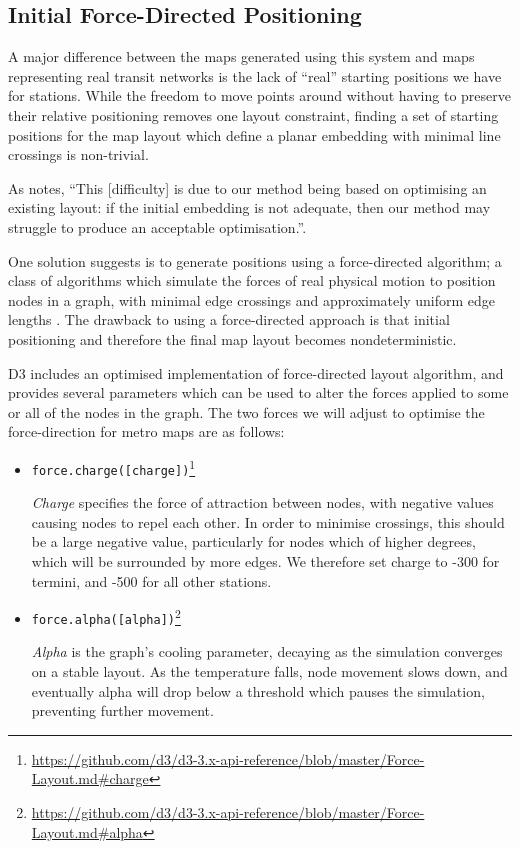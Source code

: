 \subsection{Initial Force-Directed Positioning} \label{sec:fdp}

A major difference between the maps generated using this system and maps representing real transit networks is the lack of ``real'' starting positions we have for stations. While the freedom to move points around without having to preserve their relative positioning removes one layout constraint, finding a set of starting positions for the map layout which define a planar embedding with minimal line crossings is non-trivial. 

As \citeauthor{AutomaticMetroMapLayoutThesis} notes, ``This [difficulty] is due to our method being based on optimising an existing layout: if the initial embedding is not adequate, then our method may struggle to produce an acceptable optimisation.''\cite[p.210]{AutomaticMetroMapLayoutThesis}. 

One solution \citeauthor{AutomaticMetroMapLayoutThesis} suggests is to generate positions using a force-directed algorithm; a class of algorithms which simulate the forces of real physical motion to position nodes in a graph, with minimal edge crossings and approximately uniform edge lengths \citep{springembedders}. The drawback to using a force-directed approach is that initial positioning and therefore the final map layout becomes nondeterministic. 

D3 includes an optimised implementation of  force-directed layout algorithm, and provides several parameters which can be used to alter the forces applied to some or all of the nodes in the graph. The two forces we will adjust to optimise the force-direction for metro maps are as follows:
\begin{itemize}
\item\texttt{force.charge([charge])}\footnote{\url{https://github.com/d3/d3-3.x-api-reference/blob/master/Force-Layout.md\#charge}}\par
	\textit{Charge} specifies the force of attraction between nodes, with negative values causing nodes to repel each other. In order to minimise crossings, this should be a large negative value, particularly for nodes which of higher degrees, which will be surrounded by more edges. We therefore set charge to -300 for termini, and -500 for all other stations. 

\item\texttt{force.alpha([alpha])}\footnote{\url{https://github.com/d3/d3-3.x-api-reference/blob/master/Force-Layout.md\#alpha}}\par
	\textit{Alpha} is the graph's cooling parameter, decaying as the simulation converges on a stable layout. As the temperature falls, node movement slows down, and eventually alpha will drop below a threshold which pauses the simulation, preventing further movement. 
\end{itemize}

